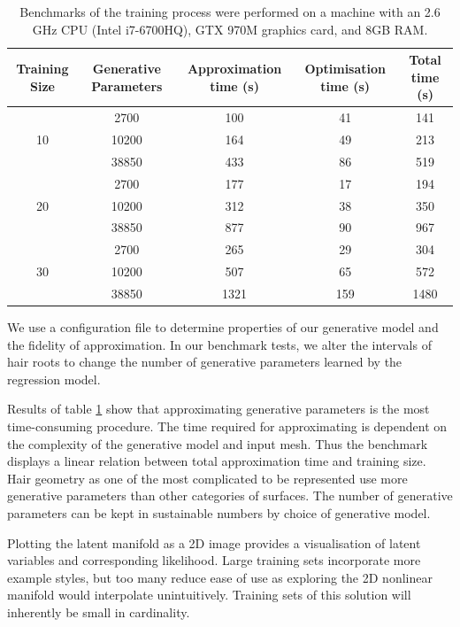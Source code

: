 \documentclass[ %
author={Dillon Keith Diep},
supervisor={Dr. Carl Henrik Ek},
degree={MEng},
title={ART-CG:},
subtitle={Assisted Real-time Content Generation of 3D Hair by Learning Manifolds},
type={Research},
year={2017} ]{dissertation}
\begin{document}
\begin{table}[!h]
	\centering
	\begin{tabular}{|c|c|c|c|c|}
		\hline
		Training Size & Generative Parameters &	Approximation time (s)	& Optimisation time (s)	&	Total time (s)\\
		\hline
		\multirow{3}{*}{10}
		& 2700 	& 100	    & 41     	& 141\\
		& 10200 & 164	    & 49		& 213\\
		& 38850 & 433      	& 86      	& 519\\
		\hline
		\multirow{3}{*}{20}
		& 2700 	& 177      	& 17        & 194\\
		& 10200 & 312      	& 38      	& 350\\
		& 38850 & 877		& 90	    & 967\\
		\hline
		\multirow{3}{*}{30}
		& 2700 	& 265      	& 29      	& 304\\
		& 10200 & 507      	& 65      	& 572\\
		& 38850 & 1321      & 159      	& 1480\\
		\hline
	\end{tabular}
	\caption{Benchmarks of the training process were performed on a machine with an 2.6 GHz CPU (Intel i7-6700HQ), GTX 970M graphics card, and 8GB RAM. }
	\label{trainingbenchmarks}
\end{table}

We use a configuration file to determine properties of our generative model and the fidelity of approximation. In our benchmark tests, we alter the intervals of hair roots to change the number of generative parameters learned by the regression model.

Results of table \ref{trainingbenchmarks} show that approximating generative parameters is the most time-consuming procedure. The time required for approximating is dependent on the complexity of the generative model and input mesh. Thus the benchmark displays a linear relation between total approximation time and training size. Hair geometry as one of the most complicated to be represented use more generative parameters than other categories of surfaces. The number of generative parameters can be kept in sustainable numbers by choice of generative model.

Plotting the latent manifold as a 2D image provides a visualisation of latent variables and corresponding likelihood. Large training sets incorporate more example styles, but too many reduce ease of use as exploring the 2D nonlinear manifold would interpolate unintuitively. Training sets of this solution will inherently be small in cardinality.
\end{document}

